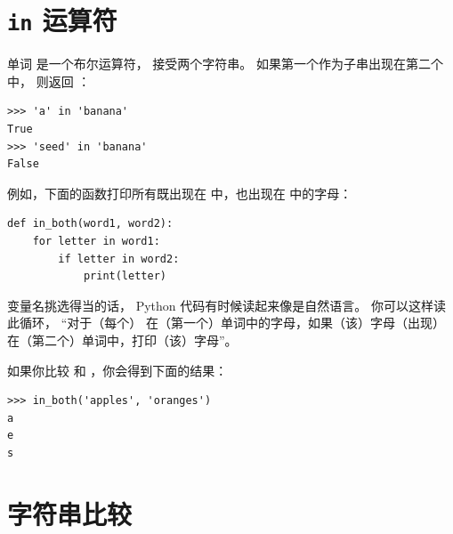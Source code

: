 \section{{\tt in} 运算符}
\label{inboth}
  
  


单词  是一个布尔运算符， 接受两个字符串。 如果第一个作为子串出现在第二个中， 则返回 ：

\begin{lstlisting}
>>> 'a' in 'banana'
True
>>> 'seed' in 'banana'
False
\end{lstlisting}

%

例如，下面的函数打印所有既出现在  中，也出现在  中的字母：

\begin{lstlisting}
def in_both(word1, word2):
    for letter in word1:
        if letter in word2:
            print(letter)
\end{lstlisting}

%

变量名挑选得当的话， Python 代码有时候读起来像是自然语言。 你可以这样读此循环， ``对于（每个） 在（第一个）单词中的字母，如果（该）字母（出现）在（第二个）单词中，打印（该）字母''。


如果你比较  和 ，你会得到下面的结果：

\begin{lstlisting}
>>> in_both('apples', 'oranges')
a
e
s
\end{lstlisting}

%

\section{字符串比较}
  

